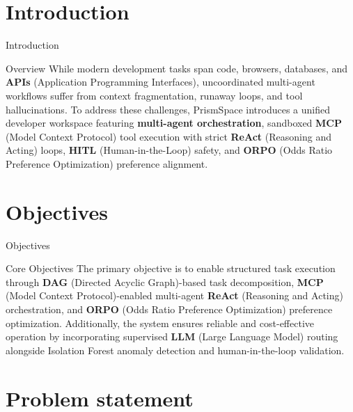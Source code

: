 \documentclass[aspectratio=169,10pt]{beamer}
\begin{document}
\section{Introduction}

\begin{frame}{Introduction}
\vspace{0.25cm}
\begin{block}{Overview}
\normalsize
While modern development tasks span code, browsers, databases, and \textbf{APIs} (Application Programming Interfaces), uncoordinated multi-agent workflows suffer from context fragmentation, runaway loops, and tool hallucinations. To address these challenges, PrismSpace introduces a unified developer workspace featuring \textbf{multi-agent orchestration}, sandboxed \textbf{MCP} (Model Context Protocol) tool execution with strict \textbf{ReAct} (Reasoning and Acting) loops, \textbf{HITL} (Human-in-the-Loop) safety, and \textbf{ORPO} (Odds Ratio Preference Optimization) preference alignment.
\end{block}
\end{frame}

\section{Objectives}

\begin{frame}{Objectives}
\vspace{0.25cm}
\begin{block}{Core Objectives}
\normalsize
The primary objective is to enable structured task execution through \textbf{DAG} (Directed Acyclic Graph)-based task decomposition, \textbf{MCP} (Model Context Protocol)-enabled multi-agent \textbf{ReAct} (Reasoning and Acting) orchestration, and \textbf{ORPO} (Odds Ratio Preference Optimization) preference optimization. Additionally, the system ensures reliable and cost-effective operation by incorporating supervised \textbf{LLM} (Large Language Model) routing alongside Isolation Forest anomaly detection and human-in-the-loop validation.
\end{block}
\end{frame}

\section{Problem statement}
\end{document}
